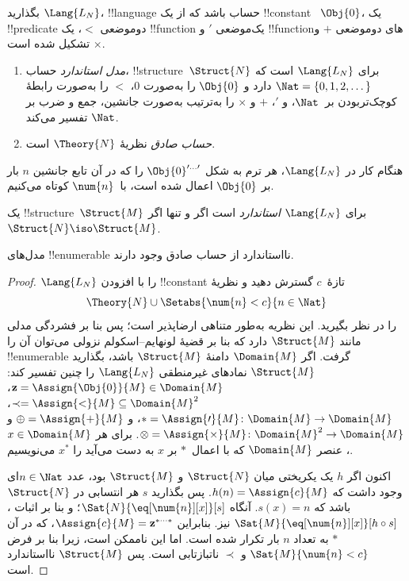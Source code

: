 \documentclass[../../../include/open-logic-section]{subfiles}
\begin{document}

\begin{defn}
بگذارید $\Lang{L_N}$، !!{language} حساب باشد که از یک !!{constant}
~$\Obj{0}$، یک !!{predicate} دوموضعی $<$، یک !!{function} یک‌موضعی
$\prime$ و !!{function}های دوموضعی $+$ و $\times$ تشکیل شده است.
\begin{enumerate}
\item \emph{مدل استاندارد} حساب، !!{structure}~$\Struct{N}$ برای
  $\Lang{L_N}$ است که $\Nat = \{ 0, 1, 2, \dots\}$ دارد و
  $\Obj{0}$ را به‌صورت $0$، $<$ را به‌صورت رابطهٔ کوچک‌تربودن
  بر~$\Nat$، و $\prime$، $+$ و $\times$ را به‌ترتیب به‌صورت جانشین،
  جمع و ضرب بر $\Nat$ تفسیر می‌کند.
\item \emph{حساب صادق} نظریهٔ $\Theory{N}$ است.
\end{enumerate}
\end{defn}

هنگام کار در $\Lang{L_N}$، هر ترم به شکل
$\Obj{0}^{\prime\dots\prime}$ را که در آن تابع جانشین $n$ بار بر
$\Obj{0}$ اعمال شده است، با~$\num{n}$ کوتاه می‌کنیم.

\begin{defn}
یک !!{structure}~$\Struct{M}$ برای $\Lang{L_N}$ \emph{استاندارد} است
اگر و تنها اگر $\Struct{N} \iso \Struct{M}$.
\end{defn}

\begin{thm}
مدل‌های !!{enumerable} نااستاندارد از حساب صادق وجود دارند.
\end{thm}

\begin{proof}
$\Lang{L_N}$ را با افزودن !!{constant} تازهٔ~$c$ گسترش دهید و نظریهٔ
\[
\Theory{N} \cup \Setabs{\num{n} < c}{n \in \Nat}
\]
را در نظر بگیرید. این نظریه به‌طور متناهی ارضاپذیر است؛ پس بنا بر
فشردگی مدلی مانند $\Struct{M}$ دارد که بنا بر قضیهٔ
لونهایم--اسکولم نزولی می‌توان آن را !!{enumerable} گرفت. اگر
$\Domain{M}$ دامنهٔ $\Struct{M}$ باشد، بگذارید $\Struct{M}$ نمادهای
غیرمنطقی $\Lang{L_N}$ را چنین تفسیر کند:
$\mathbf{z} = \Assign{\Obj{0}}{M} \in \Domain{M}$،
$\prec = \Assign{<}{M} \subseteq \Domain{M}^2$،
$* = \Assign{\prime}{M} \colon \Domain{M} \to \Domain{M}$، و
$\oplus = \Assign{+}{M}$ و
$\otimes = \Assign{\times}{M} \colon \Domain{M}^2 \to \Domain{M}$.
برای هر $x \in \Domain{M}$، عنصر $\Domain{M}$ که با اعمال~$*$ بر $x$
به دست می‌آید را $x^*$ می‌نویسیم.

اکنون اگر $h$ یک یکریختی میان $\Struct{N}$ و $\Struct{M}$ بود، عدد
$n \in \Nat$ای وجود داشت که $h(n) = \Assign{c}{M}$. پس بگذارید $s$
هر انتسابی در $\Struct{N}$ باشد که $s(x) = n$. آنگاه
$\Sat{N}{\eq[\num{n}][x]}[s]$؛ و بنا بر اثبات
،
$\Sat{M}{\eq[\num{n}][x]}[h \circ s]$ نیز. بنابراین
$\Assign{c}{M} = \mathbf{z}^{*\cdots *}$، که در آن $*$ به تعداد $n$
بار تکرار شده است. اما این ناممکن است، زیرا بنا بر فرض
$\Sat{M}{\num{n} < c}$ و $\prec$ ناتبازتابی است. پس $\Struct{M}$
نااستاندارد است.
\end{proof}
\end{document}
